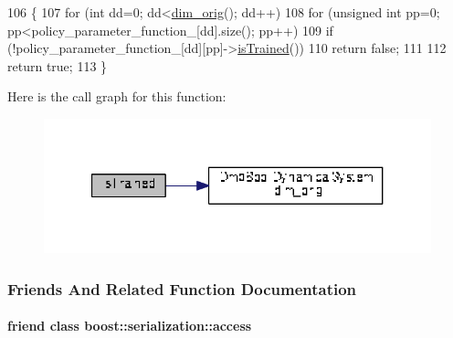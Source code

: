 \begin{DoxyCode}
106 \{
107   \textcolor{keywordflow}{for} (\textcolor{keywordtype}{int} dd=0; dd<\hyperlink{group__DynamicalSystems_ga93d7cbbf2e471b00f124e41706405a05}{dim\_orig}(); dd++)
108     \textcolor{keywordflow}{for} (\textcolor{keywordtype}{unsigned} \textcolor{keywordtype}{int} pp=0; pp<policy\_parameter\_function\_[dd].size(); pp++)
109       \textcolor{keywordflow}{if} (!policy\_parameter\_function\_[dd][pp]->\hyperlink{classDmpBbo_1_1DmpContextualTwoStep_a178135f623d9b9058870851a53299c6e}{isTrained}())
110         \textcolor{keywordflow}{return} \textcolor{keyword}{false};
111       
112   \textcolor{keywordflow}{return} \textcolor{keyword}{true};   
113 \}
\end{DoxyCode}


Here is the call graph for this function\+:
\nopagebreak
\begin{figure}[H]
\begin{center}
\leavevmode
\includegraphics[width=321pt]{classDmpBbo_1_1DmpContextualTwoStep_a178135f623d9b9058870851a53299c6e_cgraph}
\end{center}
\end{figure}




\subsubsection{Friends And Related Function Documentation}
\hypertarget{classDmpBbo_1_1DmpContextualTwoStep_ac98d07dd8f7b70e16ccb9a01abf56b9c}{
\paragraph[{boost\+::serialization\+::access}]{\setlength{\rightskip}{0pt plus 5cm}friend class boost\+::serialization\+::access\hspace{0.3cm}{\ttfamily [friend]}}}\label{classDmpBbo_1_1DmpContextualTwoStep_ac98d07dd8f7b70e16ccb9a01abf56b9c}



